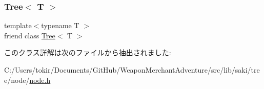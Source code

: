 \subsubsection{\texorpdfstring{Tree$<$ T $>$}{Tree< T >}}
{\footnotesize\ttfamily template$<$typename T $>$ \\
friend class \mbox{\hyperlink{classsaki_1_1_tree}{Tree}}$<$ T $>$\hspace{0.3cm}{\ttfamily [friend]}}



このクラス詳解は次のファイルから抽出されました\+:\begin{DoxyCompactItemize}
\item 
C\+:/\+Users/tokir/\+Documents/\+Git\+Hub/\+Weapon\+Merchant\+Adventure/src/lib/saki/tree/node/\mbox{\hyperlink{node_8h}{node.\+h}}\end{DoxyCompactItemize}

